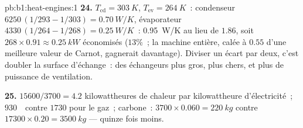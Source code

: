 \begin{solution}{pb:b1:heat-engines:1}
\textbf{24.} $T_{\mathrm{cd}} = \qty{303}{K}$, $T_{\mathrm{ev}} = \qty{264}{K}$~:
condenseur $6250\,(1/293 - 1/303) = \qty{0.70}{W/K}$, évaporateur
$4330\,(1/264 - 1/268) = \qty{0.25}{W/K}$~: \qty{0.95}{W/K} au lieu de
$1.86$, soit $268 \times 0.91 \approx \qty{0.25}{kW}$ économisés ($13\%$~; la
machine entière, calée à $0.55$ d'une meilleure valeur de Carnot, gagnerait
davantage). Diviser un écart par deux, c'est doubler la surface d'échange~:
des échangeurs plus gros, plus chers, et plus de puissance de ventilation.

\textbf{25.} $15600/3700 = 4.2$ kilowattheures de chaleur par kilowattheure
d'électricité~; $930$~\texteuro\ contre $1730$ pour le gaz~; carbone~: $3700
\times 0.060 = \qty{220}{kg}$ contre $17300 \times 0.20 = \qty{3500}{kg}$ ---
quinze fois moins.
\end{solution}
